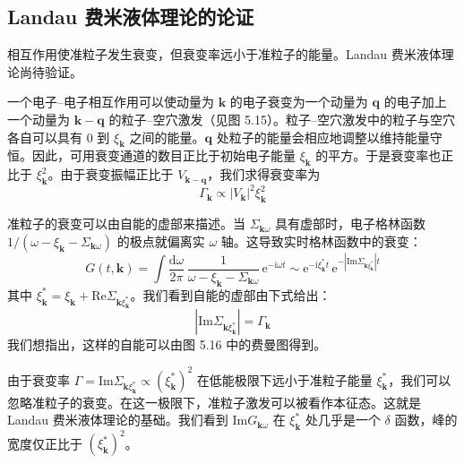 \subsection{Landau 费米液体理论的论证}

\begin{keypoints}
\item 相互作用使准粒子发生衰变，但衰变率远小于准粒子的能量。Landau 费米液体理论尚待验证。
\end{keypoints}

一个电子–电子相互作用可以使动量为 $\pmb{k}$ 的电子衰变为一个动量为 $\pmb{q}$ 的电子加上一个动量为 $\pmb{k}-\pmb{q}$ 的粒子–空穴激发（见图 5.15）。粒子–空穴激发中的粒子与空穴各自可以具有 0 到 $\xi_{\pmb{k}}$ 之间的能量。$\pmb{q}$ 处粒子的能量会相应地调整以维持能量守恒。因此，可用衰变通道的数目正比于初始电子能量 $\xi_{\pmb{k}}$ 的平方。于是衰变率也正比于 $\xi^{2}_{\pmb{k}}$。由于衰变振幅正比于 $V_{\pmb{k}-\pmb{q}}$，我们求得衰变率为
\begin{equation*}
\Gamma_{\pmb{k}}\propto|V_{\pmb{k}}|^{2}\xi^{2}_{\pmb{k}}
\end{equation*}


准粒子的衰变可以由自能的虚部来描述。当 $\Sigma_{\pmb{k}\omega}$ 具有虚部时，电子格林函数 $1/(\omega-\xi_{\pmb{k}}-\Sigma_{\pmb{k}\omega})$ 的极点就偏离实 $\omega$ 轴。这导致实时格林函数中的衰变：
\begin{equation*}
G(t,\pmb{k})=\int\frac{\mathrm{d}\omega}{2\pi}\,\frac{1}{\omega-\xi_{\pmb{k}}-\Sigma_{\pmb{k}\omega}}\,\mathrm{e}^{-\mathrm{i}\omega t}\sim\mathrm{e}^{-\mathrm{i}\xi^{*}_{\pmb{k}}t}\,\mathrm{e}^{-|\mathrm{Im}\Sigma_{\pmb{k}\xi^{*}_{\pmb{k}}}|t}
\end{equation*}
其中 $\xi^{*}_{\pmb{k}}=\xi_{\pmb{k}}+\mathrm{Re}\Sigma_{\pmb{k}\xi^{*}_{\pmb{k}}}$。我们看到自能的虚部由下式给出：
\begin{equation*}
|\mathrm{Im}\Sigma_{\pmb{k}\xi^{*}_{\pmb{k}}}|=\Gamma_{\pmb{k}}
\end{equation*}
我们想指出，这样的自能可以由图 5.16 中的费曼图得到。

由于衰变率 $\Gamma=\mathrm{Im}\Sigma_{\pmb{k}\xi^{*}_{\pmb{k}}}\propto(\xi^{*}_{\pmb{k}})^{2}$ 在低能极限下远小于准粒子能量 $\xi^{*}_{\pmb{k}}$，我们可以忽略准粒子的衰变。在这一极限下，准粒子激发可以被看作本征态。这就是 Landau 费米液体理论的基础。我们看到 $\mathrm{Im}G_{\pmb{k}\omega}$ 在 $\xi^{*}_{\pmb{k}}$ 处几乎是一个 $\delta$ 函数，峰的宽度仅正比于 $(\xi^{*}_{\pmb{k}})^{2}$。

